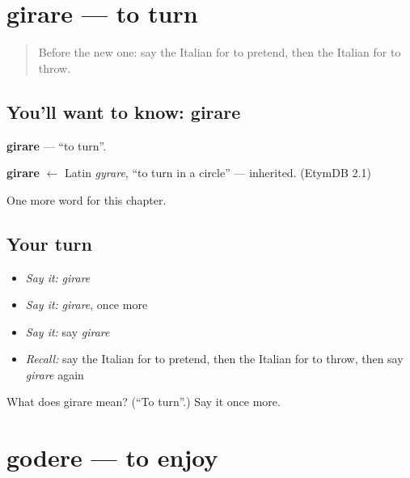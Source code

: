 \section[girare]{girare — to turn}

\label{lesson:IT-C209-girare}



\begin{quote}
Before the new one: say the Italian for to pretend, then the Italian for to throw.
\end{quote}

\subsection*{You'll want to know: girare}
\textbf{girare} — \textquotedblleft{}to turn\textquotedblright{}.

\begin{cousinweb}
\textbf{girare} $\leftarrow$ Latin \emph{gyrare}, \textquotedblleft{}to turn in a circle\textquotedblright{} — inherited. (EtymDB 2.1)
\end{cousinweb}

\begin{grammarlens}[title={What you've built}]
One more word for this chapter.
\end{grammarlens}

\subsection*{Your turn}
\begin{itemize}
\raggedright
  \item \emph{Say it:} \emph{girare}
  \item \emph{Say it:} \emph{girare}, once more
  \item \emph{Say it:} say \emph{girare}
  \item \emph{Recall:} say the Italian for to pretend, then the Italian for to throw, then say \emph{girare} again
\end{itemize}

\begin{tcolorbox}[breakable,colback=teal!4,colframe=teal!35!black,title={Before you move on}]
What does girare mean? (\textquotedblleft{}To turn\textquotedblright{}.) Say it once more.
\end{tcolorbox}
\section[godere]{godere — to enjoy}

